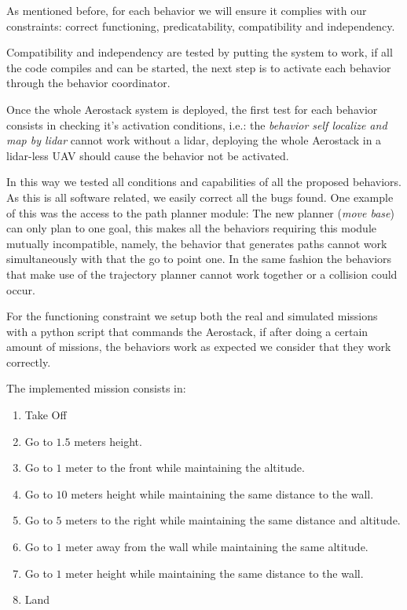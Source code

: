   As mentioned before, for each behavior we will ensure it complies with our constraints: correct functioning, predicatability, compatibility and independency. 
  
  Compatibility and independency are tested by putting the system to work, if all the code compiles and can be started, the next step is to activate each behavior through the behavior coordinator.

  Once the whole Aerostack system is deployed, the first test for each behavior consists in checking it's activation conditions, i.e.: the \textit{behavior self localize and map by lidar} cannot work without a lidar, deploying the whole Aerostack in a lidar-less UAV should cause the behavior not be activated.

  In this way we tested all conditions and capabilities of all the proposed behaviors. As this is all software related, we easily correct all the bugs found. One example of this was the access to the path planner module: The new planner (\textit{move base}) can only plan to one goal, this makes all the behaviors requiring this module mutually incompatible, namely, the behavior that generates paths cannot work simultaneously with that the go to point one. In the same fashion the behaviors that make use of the trajectory planner cannot work together or a collision could occur.

  For the functioning constraint we setup both the real and simulated missions with a python script that commands the Aerostack, if after doing a certain amount of missions, the behaviors work as expected we consider that they work correctly. 

  The implemented mission consists in:

  \begin{enumerate}
    \item Take Off
    \item Go to $1.5$ meters height.
    \item Go to $1$ meter to the front while maintaining the altitude.
    \item Go to $10$ meters height while maintaining the same distance to the wall.
    \item Go to $5$ meters to the right while maintaining the same distance and altitude.
    \item Go to $1$ meter away from the wall while maintaining the same altitude.
    \item Go to $1$ meter height while maintaining the same distance to the wall.
    \item Land
  \end{enumerate}

